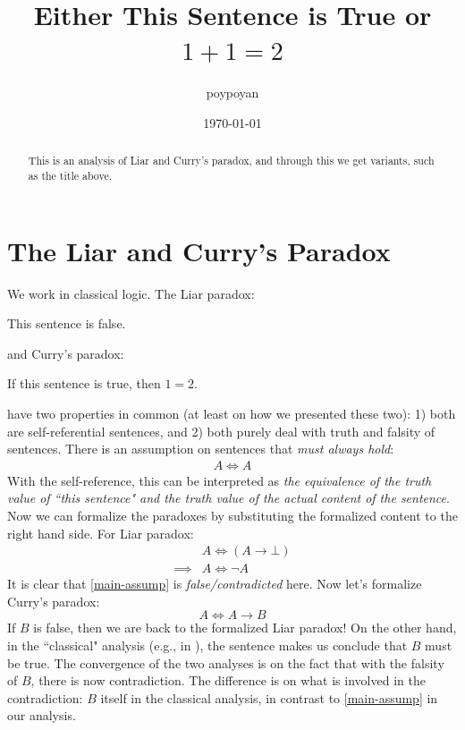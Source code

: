 \documentclass{article}
\title{Either This Sentence is True or $1+1=2$}
\author{poypoyan}
\date{\petsa\today}   %
\begin{document}
\maketitle

\begin{abstract}
This is an analysis of Liar and Curry's paradox, and through this we get variants, such as the title above.
\end{abstract}

\section{The Liar and Curry's Paradox}
We work in classical logic. The Liar paradox:
\begin{displayquote}
This sentence is false.
\end{displayquote}
and Curry's paradox:
\begin{displayquote}
If this sentence is true, then $1=2$.
\end{displayquote}
have two properties in common (at least on how we presented these two): 1) both are self-referential sentences, and 2) both purely deal with truth and falsity of sentences. There is an assumption on sentences that \textit{must always hold}:
\begin{align}\label{main-assump}
A \iff A
\end{align}
With the self-reference, this can be interpreted as \textit{the equivalence of the truth value of ``this sentence" and the truth value of the actual content of the sentence}. Now we can formalize the paradoxes by substituting the formalized content to the right hand side. For Liar paradox:
\begin{align*}
&A \iff (A \rightarrow \bot) \\
\implies &A \iff \neg A
\end{align*}
It is clear that \ref{main-assump} is \textit{false/contradicted} here. Now let's formalize Curry's paradox:
\[A \iff A \rightarrow B\]
If $B$ is false, then we are back to the formalized Liar paradox! On the other hand, in the ``classical" analysis (e.g., in \cite[An Informal Argument]{sep-curry-paradox}), the sentence makes us conclude that $B$ must be true. The convergence of the two analyses is on the fact that with the falsity of $B$, there is now contradiction. The difference is on what is involved in the contradiction: $B$ itself in the classical analysis, in contrast to \ref{main-assump} in our analysis.
\end{document}
